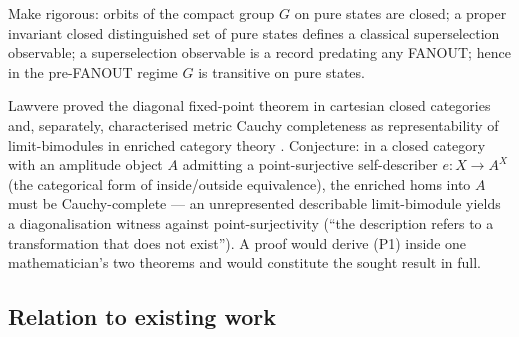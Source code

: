 \begin{openproblem}\label{op:transitivity}
Make rigorous: orbits of the compact group $G$ on pure states are closed; a proper
invariant closed distinguished set of pure states defines a classical superselection
observable; a superselection observable is a record predating any FANOUT; hence in the
pre-FANOUT regime $G$ is transitive on pure states.
\end{openproblem}

\begin{openproblem}\label{op:lawvere}
Lawvere proved the diagonal fixed-point theorem in cartesian closed categories
\cite{lawvere1969} and, separately, characterised metric Cauchy completeness as
representability of limit-bimodules in enriched category theory \cite{lawvere1973}.
Conjecture: in a closed category with an amplitude object $A$ admitting a point-surjective
self-describer $e : X \to A^{X}$ (the categorical form of inside/outside equivalence),
the enriched homs into $A$ must be Cauchy-complete --- an unrepresented describable
limit-bimodule yields a diagonalisation witness against point-surjectivity (``the
description refers to a transformation that does not exist''). A proof would derive (P1)
inside one mathematician's two theorems and would constitute the sought result in full.
\end{openproblem}

\subsection{Relation to existing work}
\label{app:cont-related}

